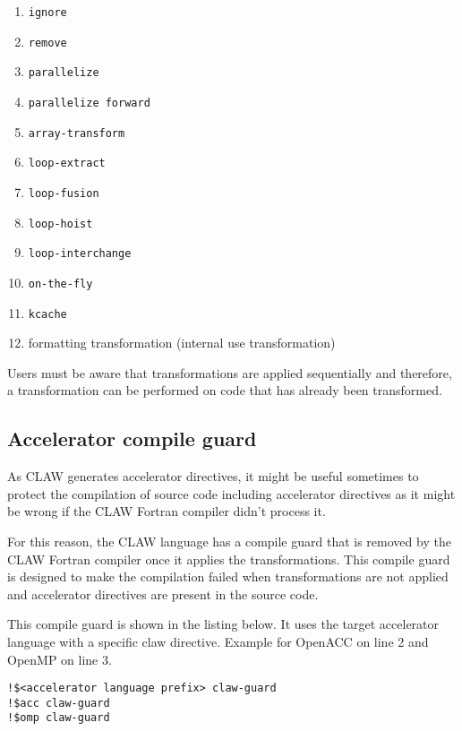\documentclass{article}
\begin{document}
\begin{enumerate}
\item \lstinline!ignore!
\item \lstinline!remove!
\item \lstinline!parallelize!
\item \lstinline!parallelize forward!
\item \lstinline!array-transform!
\item \lstinline!loop-extract!
\item \lstinline!loop-fusion!
\item \lstinline!loop-hoist!
\item \lstinline!loop-interchange!
\item \lstinline!on-the-fly!
\item \lstinline!kcache!
\item formatting transformation (internal use transformation)
\end{enumerate}

Users must be aware that transformations are applied sequentially and
therefore, a transformation can be performed on code that has already been transformed.

\subsection{Accelerator compile guard}
As CLAW generates accelerator directives, it might be useful sometimes to protect the compilation of source code including accelerator directives as it might be wrong if the CLAW Fortran compiler didn't process it. 

For this reason, the CLAW language has a compile guard that is removed by the CLAW Fortran compiler once it applies the transformations. This compile guard is designed to make the compilation failed when transformations are not applied and accelerator directives are present in the source code. 

This compile guard is shown in the listing below. It uses the target accelerator language with a specific claw directive. Example for OpenACC on line 2 and OpenMP on line 3. 

\begin{lstlisting}
!$<accelerator language prefix> claw-guard 
!$acc claw-guard
!$omp claw-guard
\end{lstlisting}






\appendix

\end{document}

